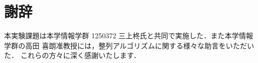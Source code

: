 \chapter*{謝辞}
本実験課題は本学情報学群 1250372 三上柊氏と共同で実施した．また本学情報学群の高田 喜朗准教授には，整列アルゴリズムに関する様々な助言をいただいた．
これらの方々に深く感謝いたします．